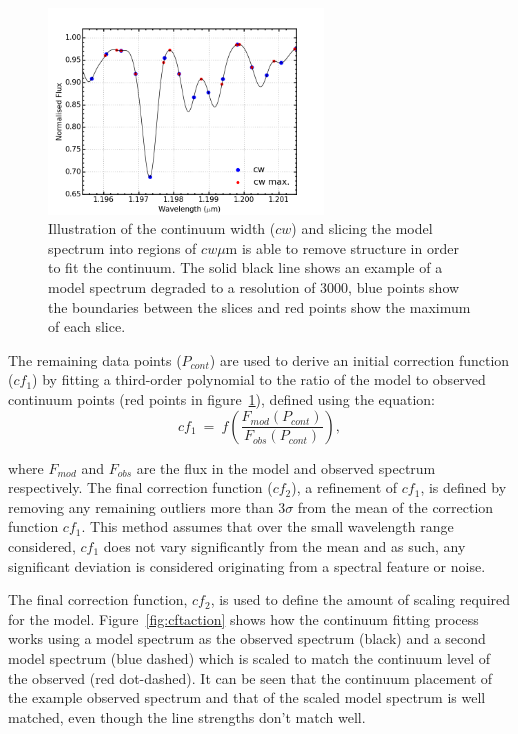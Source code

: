 \begin{figure}
 \centering
\includegraphics[width=0.65\textwidth]{JAnal/cw}
\caption[Illustration of continuum width slices and maxima]{
Illustration of the continuum width ($cw$) and slicing the model spectrum into regions of $cw\mu$m is able to remove structure in order to fit the continuum.
The solid black line shows an example of a model spectrum degraded to a resolution of 3000,
blue points show the boundaries between the slices and red points show the maximum of each slice.\label{fig:cw}
         }
\end{figure}


The remaining data points ($P_{cont}$) are used to derive an initial correction function
($cf_{1}$) by fitting a third-order polynomial to the ratio of the model to observed continuum points (red points in figure~\ref{fig:cw}), defined using the equation:
\begin{equation}
    cf_{1}~=~f(\frac{F_{mod}(P_{cont})}{F_{obs}(P_{cont})}),
\end{equation}

\noindent where $F_{mod}$ and $F_{obs}$ are the flux in the model and observed spectrum respectively.
The final correction function ($cf_{2}$), a refinement of $cf_{1}$,
is defined by removing any remaining outliers more than 3$\sigma$ from the mean of the correction function $cf_{1}$.
This method assumes that over the small wavelength range considered,
$cf_{1}$ does not vary significantly from the mean and as such, any significant deviation is considered originating from a spectral feature or noise.

The final correction function, $cf_{2}$,
is used to define the amount of scaling required for the model.
Figure~\ref{fig:cftaction} shows how the continuum fitting process works using a model spectrum as the observed spectrum (black) and a second model spectrum
(blue dashed) which is scaled to match the continuum level of the observed
(red dot-dashed).
It can be seen that the continuum placement of the example observed spectrum and that of the scaled model spectrum is well matched, even though the line strengths don't match well.

